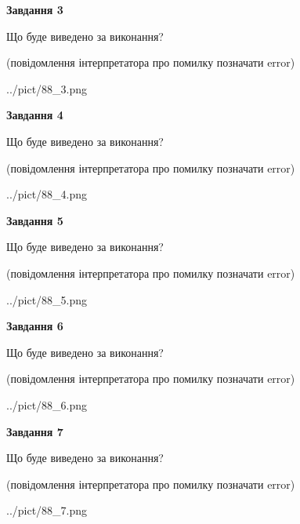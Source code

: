\documentclass[12pt, ukrainian]{article}
\begin{document}
{\begin {large}
{\begin {center}\textbf{Завдання 3}\end {center}}\par
Що буде виведено за виконання?\par
 (повідомлення інтерпретатора про помилку позначати error)\par
\begin{center}
	{../pict/88_3.png}
\end{center}
\newpage

{\begin {center}\textbf{Завдання 4}\end {center}}\par
Що буде виведено за виконання?\par
 (повідомлення інтерпретатора про помилку позначати error)\par
\begin{center}
	{../pict/88_4.png}
\end{center}
\newpage

{\begin {center}\textbf{Завдання 5}\end {center}}\par
Що буде виведено за виконання?\par
 (повідомлення інтерпретатора про помилку позначати error)\par
\begin{center}
	{../pict/88_5.png}
\end{center}
\newpage

{\begin {center}\textbf{Завдання 6}\end {center}}\par
Що буде виведено за виконання?\par
 (повідомлення інтерпретатора про помилку позначати error)\par
\begin{center}
	{../pict/88_6.png}
\end{center}
\newpage

{\begin {center}\textbf{Завдання 7}\end {center}}\par
Що буде виведено за виконання?\par
 (повідомлення інтерпретатора про помилку позначати error)\par
\begin{center}
	{../pict/88_7.png}
\end{center}
\newpage


\end{large}}
\end{document}
